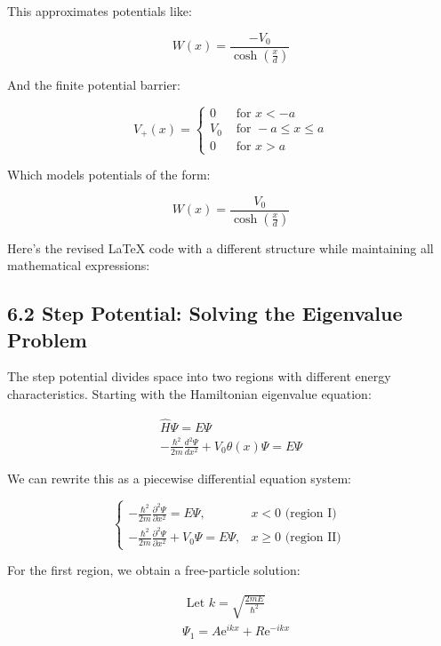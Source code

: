 \documentclass[italian]{HKNdocument}
\begin{document}
This approximates potentials like:

\begin{equation*}
W(x)=\frac{-V_{0}}{\cosh \left(\frac{x}{d}\right)} \tag{6.5}
\end{equation*}

And the finite potential barrier:

\[
V_{+}(x)= \begin{cases}0 & \text { for } x<-a  \tag{6.6}\\ V_{0} & \text { for }-a \leq x \leq a \\ 0 & \text { for } x>a\end{cases}
\]

Which models potentials of the form:

\begin{equation*}
W(x)=\frac{V_{0}}{\cosh \left(\frac{x}{d}\right)} \tag{6.7}
\end{equation*}

Here's the revised LaTeX code with a different structure while maintaining all mathematical expressions:


\subsection*{6.2 Step Potential: Solving the Eigenvalue Problem}

The step potential divides space into two regions with different energy characteristics. Starting with the Hamiltonian eigenvalue equation:

\begin{gather*}
\hat{H} \Psi=E \Psi  \tag{6.8}\\
-\frac{\hbar^{2}}{2 m} \frac{d^{2} \Psi}{d x^{2}}+V_{0} \theta(x) \Psi=E \Psi \tag{6.9}
\end{gather*}

We can rewrite this as a piecewise differential equation system:

\[
\begin{cases}-\frac{\hbar^{2}}{2 m} \frac{\partial^{2} \Psi}{\partial x^{2}}=E \Psi, & x<0 \text { (region I) }  \tag{6.10}\\ -\frac{\hbar^{2}}{2 m} \frac{\partial^{2} \Psi}{\partial x^{2}}+V_{0} \Psi=E \Psi, & x \geq 0 \text { (region II) }\end{cases}
\]

For the first region, we obtain a free-particle solution:

\begin{align*}
& \text { Let } k=\sqrt{\frac{2 m E}{\hbar^{2}}}  \tag{6.11}\\
& \Psi_{1}=A \mathrm{e}^{i k x}+R \mathrm{e}^{-i k x}
\end{align*}
\end{document}

